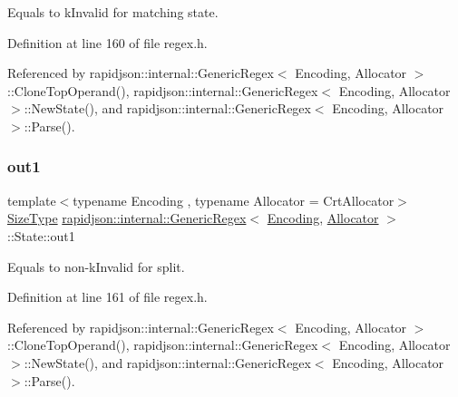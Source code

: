 Equals to k\+Invalid for matching state. 



Definition at line 160 of file regex.\+h.



Referenced by rapidjson\+::internal\+::\+Generic\+Regex$<$ Encoding, Allocator $>$\+::\+Clone\+Top\+Operand(), rapidjson\+::internal\+::\+Generic\+Regex$<$ Encoding, Allocator $>$\+::\+New\+State(), and rapidjson\+::internal\+::\+Generic\+Regex$<$ Encoding, Allocator $>$\+::\+Parse().

\mbox{\label{structrapidjson_1_1internal_1_1_generic_regex_1_1_state_aae1c31692a87d24a3ee023c49bd7da69}} 
\subsubsection{\texorpdfstring{out1}{out1}}
{\footnotesize\ttfamily template$<$typename Encoding , typename Allocator  = Crt\+Allocator$>$ \\
\mbox{\hyperlink{namespacerapidjson_a44eb33eaa523e36d466b1ced64b85c84}{Size\+Type}} \mbox{\hyperlink{classrapidjson_1_1internal_1_1_generic_regex}{rapidjson\+::internal\+::\+Generic\+Regex}}$<$ \mbox{\hyperlink{classrapidjson_1_1_encoding}{Encoding}}, \mbox{\hyperlink{classrapidjson_1_1_allocator}{Allocator}} $>$\+::State\+::out1}



Equals to non-\/k\+Invalid for split. 



Definition at line 161 of file regex.\+h.



Referenced by rapidjson\+::internal\+::\+Generic\+Regex$<$ Encoding, Allocator $>$\+::\+Clone\+Top\+Operand(), rapidjson\+::internal\+::\+Generic\+Regex$<$ Encoding, Allocator $>$\+::\+New\+State(), and rapidjson\+::internal\+::\+Generic\+Regex$<$ Encoding, Allocator $>$\+::\+Parse().

\mbox{\label{structrapidjson_1_1internal_1_1_generic_regex_1_1_state_aab2551bea6dd0e7d35eb705e6e23d19c}} 

